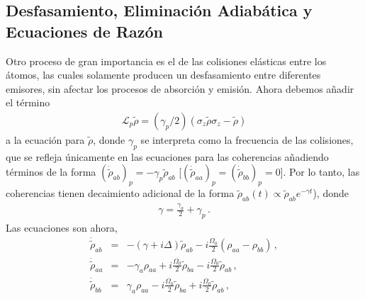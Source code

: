\documentclass[12pt]{report}
\begin{document}
\subsection{Desfasamiento, Eliminaci\'on Adiab\'atica y Ecuaciones 
de Raz\'on} 
Otro proceso de gran importancia es el de las colisiones el\'asticas entre 
los \'atomos, las cuales solamente producen un desfasamiento entre 
diferentes emisores, sin afectar los procesos de absorci\'on y emisi\'on. 
Ahora debemos a\~nadir el t\'ermino 
%
\begin{eqnarray}
\mathcal{L}_p \tilde{\rho} = 
	 (\gamma_p /2) (\sigma_z \tilde{\rho} \sigma_z -\tilde{\rho}) 
\end{eqnarray}
a la ecuaci\'on para $\tilde{\rho}$, donde $\gamma_p$ se interpreta como 
la frecuencia de las colisiones, que se refleja \'unicamente en las 
ecuaciones para las coherencias a\~nadiendo t\'erminos de la forma 
$(\dot{{\tilde{\rho}}}_{ab})_p = -\gamma_p \tilde{\rho}_{ab}$ 
[$(\dot{{\tilde{\rho}}}_{aa})_p = (\dot{{\tilde{\rho}}}_{bb})_p = 0$]. 
Por lo tanto, las coherencias tienen decaimiento adicional de la forma 
$\tilde{\rho}_{ab} (t) \propto \tilde{\rho}_{ab} e^{- \gamma t}$), donde  
%
\begin{eqnarray}
\gamma = \frac{\gamma_a}{2} +\gamma_p  \,. 
\end{eqnarray}
Las ecuaciones son ahora, 
%
\begin{eqnarray} 	%
\dot{\tilde{\rho}}_{ab} 
	&=& - \left( \gamma +i\Delta \right) \tilde{\rho}_{ab}
	-i\frac{\Omega_0}{2} (\rho_{aa} -\rho_{bb}) 	\,, \nonumber \\ 
\dot{\tilde{\rho}}_{aa} 
	&=& -\gamma_a \rho_{aa} + i\frac{\Omega_0}{2} \tilde{\rho}_{ba} 
	- i\frac{\Omega_0}{2} \tilde{\rho}_{ab} 	\,, 	\nonumber \\ 
\dot{\tilde{\rho}}_{bb} 
	&=& \gamma_a \rho_{aa} - i\frac{\Omega_0}{2} \tilde{\rho}_{ba} 
	+ i\frac{\Omega_0}{2} \tilde{\rho}_{ab} 	\,,
\end{eqnarray}
\end{document}
